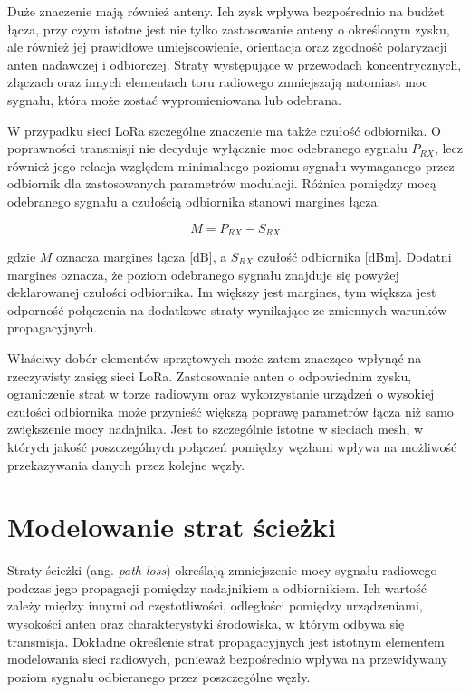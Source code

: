 \documentclass[12pt,a4paper,twoside]{report}
\theoremstyle{definition} %
\begin{document}
Duże znaczenie mają również anteny. Ich zysk wpływa bezpośrednio na budżet łącza, przy czym istotne jest nie tylko zastosowanie anteny o określonym zysku, ale również jej prawidłowe umiejscowienie, orientacja oraz zgodność polaryzacji anten nadawczej i odbiorczej. Straty występujące w przewodach koncentrycznych, złączach oraz innych elementach toru radiowego zmniejszają natomiast moc sygnału, która może zostać wypromieniowana lub odebrana.

W przypadku sieci LoRa szczególne znaczenie ma także czułość odbiornika. O poprawności transmisji nie decyduje wyłącznie moc odebranego sygnału \(P_{RX}\), lecz również jego relacja względem minimalnego poziomu sygnału wymaganego przez odbiornik dla zastosowanych parametrów modulacji. Różnica pomiędzy mocą odebranego sygnału a czułością odbiornika stanowi margines łącza:

	\begin{equation}\label{M}
        M = P_{RX} - S_{RX}
    \end{equation}

gdzie \(M\) oznacza margines łącza [dB], a \(S_{RX}\) czułość odbiornika [dBm]. Dodatni margines oznacza, że poziom odebranego sygnału znajduje się powyżej deklarowanej czułości odbiornika. Im większy jest margines, tym większa jest odporność połączenia na dodatkowe straty wynikające ze zmiennych warunków propagacyjnych.

Właściwy dobór elementów sprzętowych może zatem znacząco wpłynąć na rzeczywisty zasięg sieci LoRa. Zastosowanie anten o odpowiednim zysku, ograniczenie strat w torze radiowym oraz wykorzystanie urządzeń o wysokiej czułości odbiornika może przynieść większą poprawę parametrów łącza niż samo zwiększenie mocy nadajnika. Jest to szczególnie istotne w sieciach mesh, w których jakość poszczególnych połączeń pomiędzy węzłami wpływa na możliwość przekazywania danych przez kolejne węzły.

\section{Modelowanie strat ścieżki}

Straty ścieżki (ang. \textit{path loss}) określają zmniejszenie mocy sygnału radiowego podczas jego propagacji pomiędzy nadajnikiem a odbiornikiem. Ich wartość zależy między innymi od częstotliwości, odległości pomiędzy urządzeniami, wysokości anten oraz charakterystyki środowiska, w którym odbywa się transmisja. Dokładne określenie strat propagacyjnych jest istotnym elementem modelowania sieci radiowych, ponieważ bezpośrednio wpływa na przewidywany poziom sygnału odbieranego przez poszczególne węzły.
\end{document}
